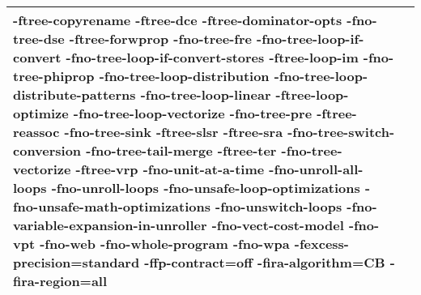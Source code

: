 \begin{tabular}{|l|p{6.2in}|}
\textbf{-ftree-copyrename} \textbf{-ftree-dce} \textbf{-ftree-dominator-opts} -fno-tree-dse \textbf{-ftree-forwprop} -fno-tree-fre -fno-tree-loop-if-convert -fno-tree-loop-if-convert-stores \textbf{-ftree-loop-im} -fno-tree-phiprop -fno-tree-loop-distribution -fno-tree-loop-distribute-patterns -fno-tree-loop-linear \textbf{-ftree-loop-optimize} -fno-tree-loop-vectorize -fno-tree-pre \textbf{-ftree-reassoc} -fno-tree-sink \textbf{-ftree-slsr} \textbf{-ftree-sra} -fno-tree-switch-conversion -fno-tree-tail-merge \textbf{-ftree-ter} -fno-tree-vectorize \textbf{-ftree-vrp} -fno-unit-at-a-time -fno-unroll-all-loops -fno-unroll-loops -fno-unsafe-loop-optimizations -fno-unsafe-math-optimizations -fno-unswitch-loops -fno-variable-expansion-in-unroller -fno-vect-cost-model -fno-vpt -fno-web -fno-whole-program -fno-wpa \textbf{-fexcess-precision=standard} \textbf{-ffp-contract=off} \textbf{-fira-algorithm=CB} \textbf{-fira-region=all} }\\
     \hline
    \end{tabular}    